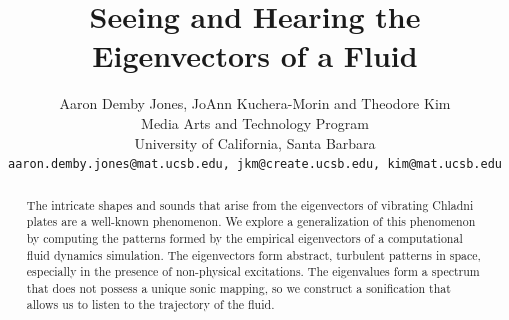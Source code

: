 \documentclass[11pt]{article}
\title{Seeing and Hearing the Eigenvectors of a Fluid}
\author{ Aaron Demby Jones, JoAnn Kuchera-Morin and Theodore Kim\\
Media Arts and Technology Program\\ University of California, Santa Barbara\\
{\tt aaron.demby.jones@mat.ucsb.edu, jkm@create.ucsb.edu, kim@mat.ucsb.edu}
}
\date{}				%
\begin{document}
\newcommand{\UU}{\mathbf{U}}
\newcommand{\truncU}{\mathbf{U}_{\textnormal{trunc}}}
\newcommand{\uu}{\mathbf{u}}
\newcommand{\vv}{\mathbf{v}}
\newcommand{\xx}{\mathbf{x}}
\newcommand{\utilde}{\mathbf{q}}
\newcommand{\ff}{\mathbf{f}}
\newcommand{\qq}{\mathbf{q}}
\newcommand{\aaa}{\mathbf{a}}
\newcommand{\R}{\mathbb{R}}
\newcommand{\subspace}{\mathbb{S}}
\newcommand{\boldA}{\mathbf{A}}
\newcommand{\boldX}{\mathbf{X}}
\newcommand{\VV}{\mathbf{V}}
\newcommand{\todo}[1]{$\spadesuit$ {\bf #1} $\spadesuit$}


\maketitle

\thispagestyle{empty}

\begin{abstract}
The intricate shapes and sounds that arise from the eigenvectors of vibrating Chladni plates are a well-known phenomenon. We explore a generalization of this phenomenon by computing the patterns formed by the empirical eigenvectors of a computational fluid dynamics simulation. The eigenvectors form abstract, turbulent patterns in space, especially in the presence of non-physical excitations. The eigenvalues form a spectrum that does not possess a unique sonic mapping, so we construct a sonification that allows us to listen to the trajectory of the fluid.
\end{abstract}


\end{document}
